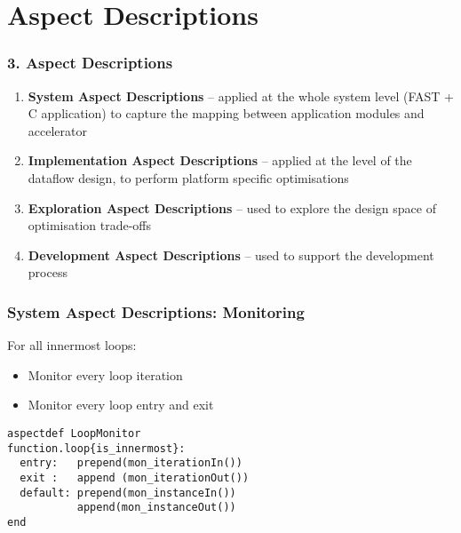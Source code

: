 \section{Aspect Descriptions}
\begin{frame}
  \frametitle{3. Aspect Descriptions}
  \begin{enumerate}
  \setlength{\itemsep}{15pt}
  \item \textbf{System Aspect Descriptions} -- applied at the whole
    system level (FAST + C application) to capture the mapping
    between application modules and accelerator
  \item \textbf{Implementation Aspect Descriptions} -- applied at the
    level of the dataflow design, to perform platform specific
    optimisations
  \item \textbf{Exploration Aspect Descriptions} -- used to explore the
    design space of optimisation trade-offs
  \item \textbf{Development Aspect Descriptions}  -- used to support
    the development process
  \end{enumerate}
\end{frame}

\begin{comment}
\begin{frame}
  \frametitle{System Aspect Descriptions}
  Hardware/Software Partitioning:
  \begin{enumerate}
  \setlength{\itemsep}{10pt}
  \item detect hotspots
  \item detect code patterns suitable for acceleration
  \item perform outlining transformation
  \item derive dataflow \texttt{fast\_f()} from \texttt{f()}
  \item place FAST pragma to link \texttt{fast\_f()} with \texttt{f()}
  \end{enumerate}
\end{frame}
\end{comment}



\begin{frame}[fragile]
  \frametitle{System Aspect Descriptions: Monitoring}
  For all innermost loops:
  \begin{itemize}
  \item Monitor every loop iteration
  \item Monitor every loop entry and exit
  \end{itemize}
  \begin{lstlisting}[label=lst:label, style=lara]
aspectdef LoopMonitor
function.loop{is_innermost}:
  entry:   prepend(mon_iterationIn())
  exit :   append (mon_iterationOut())
  default: prepend(mon_instanceIn())
           append(mon_instanceOut())
end
  \end{lstlisting}
\end{frame}

